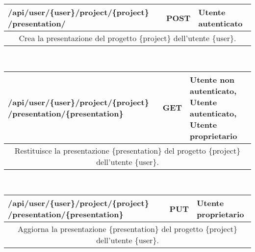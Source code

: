 \begin{table}[H]
	\begin{tabular}{|p{}|p{}|p{}|}
		\toprule
		\textbf{/api/user/\{user\}/project/\{project\}
		/presentation/} & \textbf{POST} & \textbf{Utente autenticato} \\ \midrule
		\multicolumn{3}{|c|}{Crea la presentazione del progetto \{project\} dell'utente \{user\}.} \\
		\bottomrule
	\end{tabular}\\
	\par\bigskip

	\begin{tabular}{|p{}|p{}|p{}|}
		\toprule
		\textbf{/api/user/\{user\}/project/\{project\}
		/presentation/\{presentation\}} & \textbf{GET} & \textbf{Utente non autenticato, Utente autenticato, Utente proprietario} \\ \midrule
		\multicolumn{3}{|c|}{Restituisce la presentazione \{presentation\} del progetto \{project\} dell'utente \{user\}.} \\
		\bottomrule
	\end{tabular}\\
	\par\bigskip
	
	\begin{tabular}{|p{}|p{}|p{}|}
		\toprule
		\textbf{/api/user/\{user\}/project/\{project\}
		/presentation/\{presentation\}} & \textbf{PUT} & \textbf{Utente proprietario} \\ \midrule
		\multicolumn{3}{|c|}{Aggiorna la presentazione \{presentation\} del progetto \{project\} dell'utente \{user\}.} \\
		\bottomrule
	\end{tabular}\\
	\par\bigskip
	
\end{table}
\newpage



